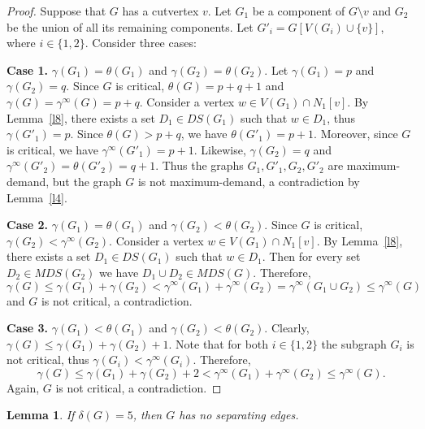 \documentclass[12pt]{article}
\newtheorem{lemma}{Lemma}
\begin{document}
\begin{proof}
Suppose that $G$ has a cutvertex $v$. Let $G_1$ be a component of $G \setminus v$ and $G_2$ be the union of all its remaining components. Let $G'_i = G[V(G_i) \cup \{v\}]$, where $i \in \{1,2\}$. Consider three cases:

\textbf{Case 1.} $\gamma(G_1) = \theta(G_1)$ and $\gamma(G_2) = \theta(G_2)$. Let $\gamma(G_1) = p$ and $\gamma(G_2) = q$. Since $G$ is critical, $ \theta(G) = p + q + 1$ and $\gamma(G) = \gamma^{\infty}(G) = p + q$. Consider a vertex $w \in V(G_1) \cap N_1[v]$. By Lemma~\ref{l8}, there exists a set $D_1 \in DS(G_1)$ such that $w \in D_1$, thus $\gamma(G'_1) = p$. Since $\theta(G) > p + q$, we have $\theta(G'_1) = p + 1$. Moreover, since $G$ is critical, we have $\gamma^{\infty}(G'_1) = p + 1$. Likewise, $\gamma(G_2) = q$ and $\gamma^{\infty}(G'_2) = \theta(G'_2) = q + 1$. Thus the graphs $G_1,G'_1,G_2,G'_2$ are maximum-demand, but the graph $G$ is not maximum-demand, a contradiction by Lemma~\ref{l4}.

\textbf{Case 2.} $\gamma(G_1) = \theta(G_1)$ and $\gamma(G_2) < \theta(G_2)$. Since $G$ is critical, $\gamma(G_2) < \gamma^{\infty}(G_2)$. Consider a vertex $w \in V(G_1) \cap N_1[v]$. By Lemma~\ref{l8}, there exists a set $D_1 \in DS(G_1)$ such that $w \in D_1$. Then for every set $D_2 \in MDS(G_2)$ we have $D_1 \cup D_2 \in MDS(G)$. Therefore, $$\gamma(G) \leq \gamma(G_1) + \gamma(G_2) < \gamma^{\infty}(G_1) + \gamma^{\infty}(G_2) = \gamma^{\infty}(G_1 \cup G_2) \leq \gamma^{\infty}(G)$$
and $G$ is not critical, a contradiction.

\textbf{Case 3.} $\gamma(G_1) < \theta(G_1)$ and $\gamma(G_2) < \theta(G_2)$. Clearly, $\gamma(G) \leq \gamma(G_1) + \gamma(G_2) + 1$. Note that for both $i \in \{1,2\}$ the subgraph $G_i$ is not critical, thus $\gamma(G_i) < \gamma^{\infty}(G_i)$. Therefore, 
$$\gamma(G) \leq \gamma(G_1) + \gamma(G_2) + 2 < \gamma^{\infty}(G_1) + \gamma^{\infty}(G_2) \leq \gamma^{\infty}(G).$$
Again, $G$ is not critical, a contradiction.
\end{proof}

\begin{lemma}\label{l17}
If $\delta(G) = 5$, then $G$ has no separating edges.
\end{lemma}
\end{document}
